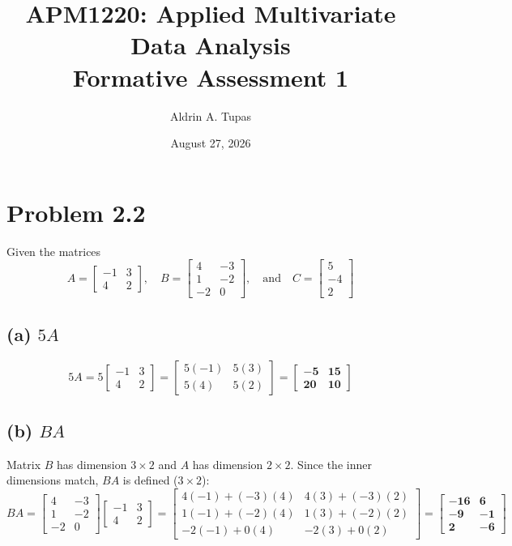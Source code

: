 \documentclass[11pt]{article}
\title{\textbf{APM1220: Applied Multivariate Data Analysis}\\ Formative Assessment 1}
\author{Aldrin A. Tupas}
\date{August 27, 2026}
\begin{document}
\maketitle
\section*{Problem 2.2}
Given the matrices
\[
A = \begin{bmatrix} -1 & 3 \\ 4 & 2 \end{bmatrix}, \quad
B = \begin{bmatrix} 4 & -3 \\ 1 & -2 \\ -2 & 0 \end{bmatrix}, \quad \text{and} \quad
C = \begin{bmatrix} 5 \\ -4 \\ 2 \end{bmatrix}
\]

\subsection*{(a) $5A$}
\[
5A = 5 \begin{bmatrix} -1 & 3 \\ 4 & 2 \end{bmatrix} 
= \begin{bmatrix} 5(-1) & 5(3) \\ 5(4) & 5(2) \end{bmatrix} 
= \mathbf{\begin{bmatrix} -5 & 15 \\ 20 & 10 \end{bmatrix}}
\]

\subsection*{(b) $BA$}
Matrix $B$ has dimension $3 \times 2$ and $A$ has dimension $2 \times 2$. Since the inner dimensions match, $BA$ is defined ($3 \times 2$):
\[
BA = \begin{bmatrix} 4 & -3 \\ 1 & -2 \\ -2 & 0 \end{bmatrix} \begin{bmatrix} -1 & 3 \\ 4 & 2 \end{bmatrix}
= \begin{bmatrix} 4(-1) + (-3)(4) & 4(3) + (-3)(2) \\ 1(-1) + (-2)(4) & 1(3) + (-2)(2) \\ -2(-1) + 0(4) & -2(3) + 0(2) \end{bmatrix}
= \mathbf{\begin{bmatrix} -16 & 6 \\ -9 & -1 \\ 2 & -6 \end{bmatrix}}
\]
\end{document}
